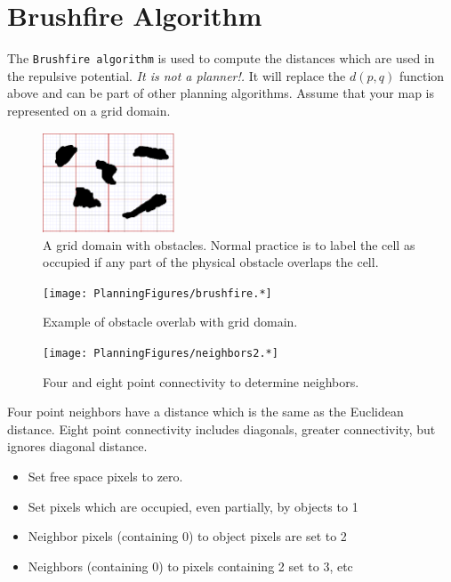 \hypertarget{brushfire-algorithm}{%
\section{Brushfire Algorithm}\label{brushfire-algorithm}}

The \texttt{Brushfire\ algorithm} is used to compute the distances which
are used in the repulsive potential. \emph{It is not a planner!.} It
will replace the \(d(p,q)\) function above and can be part of other
planning algorithms. Assume that your map is represented on a grid
domain.

\begin{figure}
\centering
\includegraphics[width=0.35\textwidth,height=\textheight]{PlanningFigures/griddomain.png}
\caption{A grid domain with obstacles. Normal practice is to label the
cell as occupied if any part of the physical obstacle overlaps the
cell.}
\end{figure}

\begin{figure}
\centering
\texttt{[image: PlanningFigures/brushfire.*]}
\caption{Example of obstacle overlab with grid domain.}
\end{figure}

\begin{figure}
\centering
\texttt{[image: PlanningFigures/neighbors2.*]}
\caption{Four and eight point connectivity to determine neighbors.}
\end{figure}

Four point neighbors have a distance which is the same as the Euclidean
distance. Eight point connectivity includes diagonals, greater
connectivity, but ignores diagonal distance.

\begin{itemize}
\tightlist
\item
  Set free space pixels to zero.
\item
  Set pixels which are occupied, even partially, by objects to 1
\item
  Neighbor pixels (containing 0) to object pixels are set to 2
\item
  Neighbors (containing 0) to pixels containing 2 set to 3, etc
\end{itemize}

